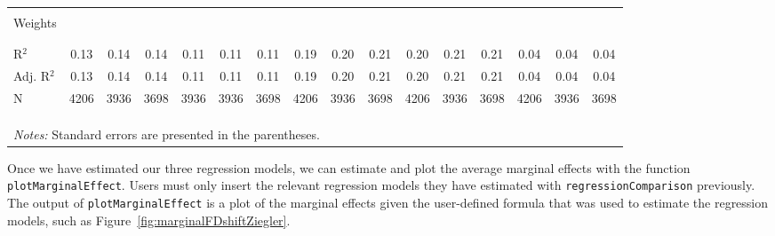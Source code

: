 \documentclass[12pt,letterpaper]{article}
\begin{document}
\begin{landscape}
\begin{table}[h!]
\begin{adjustbox}{max width=1.45\textwidth}
\begin{tabular}{l c c c c c c c c c c c c c c c }
				\\[-1.8ex]\hline  \\[-1.8ex] 
				Weights         &              & \checkmark &              &  &        \checkmark      & &               &  \checkmark &              & &         \checkmark     & &              & \checkmark&  \\
				\\[-1.8ex]\hline  \\[-1.8ex] 
				R$^2$                            & 0.13         & 0.14         & 0.14         & 0.11         & 0.11         & 0.11         & 0.19          & 0.20          & 0.21          & 0.20         & 0.21         & 0.21         & 0.04         & 0.04         & 0.04         \\
				Adj. R$^2$                       & 0.13         & 0.14         & 0.14         & 0.11         & 0.11         & 0.11         & 0.19          & 0.20          & 0.21          & 0.20         & 0.21         & 0.21         & 0.04         & 0.04         & 0.04         \\
				N                        & 4206         & 3936         & 3698         & 3936         & 3936         & 3698         & 4206          & 3936          & 3698          & 4206         & 3936         & 3698         & 4206         & 3936         & 3698         \\
				\\\hline\\[-3.8ex]
				\hline \\[-1.8ex]
				
				\multicolumn{16}{l}{\footnotesize{\textit{Notes:} %
						Standard errors are presented in the parentheses.%
				}}
			\end{tabular}
		\end{adjustbox}
	\end{table}
\end{landscape}

Once we have estimated our three regression models, we can estimate and plot the average marginal effects with the function \texttt{\footnotesize plotMarginalEffect}. Users must only insert the relevant regression models they have estimated with \texttt{\footnotesize regressionComparison} previously. The output of \texttt{\footnotesize plotMarginalEffect} is a plot of the marginal effects given the user-defined formula that was used to estimate the regression models, such as Figure~\ref{fig:marginalFDshiftZiegler}.
\end{document}

